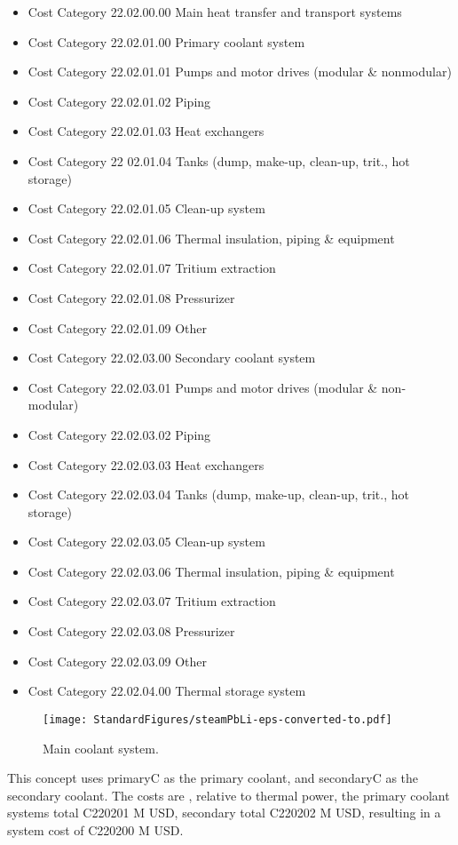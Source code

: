 \begin{itemize}
    \item Cost Category 22.02.00.00    Main heat transfer and transport systems
    \item Cost Category 22.02.01.00      Primary coolant system
    \item Cost Category 22.02.01.01        Pumps and  motor drives (modular \& nonmodular)
    \item Cost Category 22.02.01.02        Piping
    \item Cost Category 22.02.01.03        Heat exchangers
    \item Cost Category 22 02.01.04        Tanks (dump, make-up, clean-up, trit., hot storage)
    \item Cost Category 22.02.01.05        Clean-up system
    \item Cost Category 22.02.01.06        Thermal insulation, piping \& equipment
    \item Cost Category 22.02.01.07        Tritium extraction
    \item Cost Category 22.02.01.08        Pressurizer
    \item Cost Category 22.02.01.09        Other
    \item Cost Category 22.02.03.00      Secondary coolant system
    \item Cost Category 22.02.03.01        Pumps and motor drives (modular \& non-modular)
    \item Cost Category 22.02.03.02        Piping
    \item Cost Category 22.02.03.03        Heat exchangers
    \item Cost Category 22.02.03.04        Tanks (dump, make-up, clean-up, trit., hot storage)
    \item Cost Category 22.02.03.05        Clean-up system
    \item Cost Category 22.02.03.06        Thermal insulation, piping \& equipment
    \item Cost Category 22.02.03.07        Tritium extraction
    \item Cost Category 22.02.03.08        Pressurizer
    \item Cost Category 22.02.03.09        Other
    \item Cost Category 22.02.04.00      Thermal storage system
\end{itemize}

\begin{figure}[h!]
    \centering
    \texttt{[image: StandardFigures/steamPbLi-eps-converted-to.pdf]}
    \caption{Main coolant system.}
    \label{fig:coola}
\end{figure}

This concept uses primaryC as the primary coolant, and secondaryC as the secondary coolant.  The costs are , relative to thermal power, the primary coolant systems total C220201 M USD, secondary total C220202 M USD, resulting in a system cost of C220200 M USD.